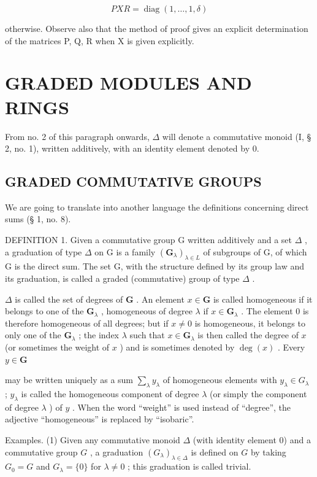 \[
P X R = \operatorname{diag} (1, \dots , 1, \delta)
\]

otherwise. Observe also that the method of proof gives an explicit determination of the matrices P, Q, R when X is given explicitly.

\section{GRADED MODULES AND RINGS}

From no. 2 of this paragraph onwards, \(\Delta\) will denote a commutative monoid (I, § 2, no. 1), written additively, with an identity element denoted by 0.

\subsection{GRADED COMMUTATIVE GROUPS}

We are going to translate into another language the definitions concerning direct sums (§ 1, no. 8).

DEFINITION 1. Given a commutative group G written additively and a set \(\Delta\) , a graduation of type \(\Delta\) on G is a family \((\mathbf{G}_{\lambda})_{\lambda \in L}\) of subgroups of G, of which G is the direct sum. The set G, with the structure defined by its group law and its graduation, is called a graded (commutative) group of type \(\Delta\) .

\(\Delta\) is called the set of degrees of \(\mathbf{G}\) . An element \(x \in \mathbf{G}\) is called homogeneous if it belongs to one of the \(\mathbf{G}_{\lambda}\) , homogeneous of degree \(\lambda\) if \(x \in \mathbf{G}_{\lambda}\) . The element 0 is therefore homogeneous of all degrees; but if \(x \neq 0\) is homogeneous, it belongs to only one of the \(\mathbf{G}_{\lambda}\) ; the index \(\lambda\) such that \(x \in \mathbf{G}_{\lambda}\) is then called the degree of \(x\) (or sometimes the weight of \(x\) ) and is sometimes denoted by \(\deg(x)\) . Every \(y \in \mathbf{G}\)

may be written uniquely as a sum \(\sum_{\lambda} y_{\lambda}\) of homogeneous elements with \(y_{\lambda} \in G_{\lambda}\) ; \(y_{\lambda}\) is called the homogeneous component of degree \(\lambda\) (or simply the component of degree \(\lambda\) ) of \(y\) . When the word ``weight'' is used instead of ``degree'', the adjective ``homogeneous'' is replaced by ``isobaric''.

Examples. (1) Given any commutative monoid \(\Delta\) (with identity element 0) and a commutative group \(G\) , a graduation \((G_{\lambda})_{\lambda \in \Delta}\) is defined on \(G\) by taking \(G_0 = G\) and \(G_{\lambda} = \{0\}\) for \(\lambda \neq 0\) ; this graduation is called trivial.

